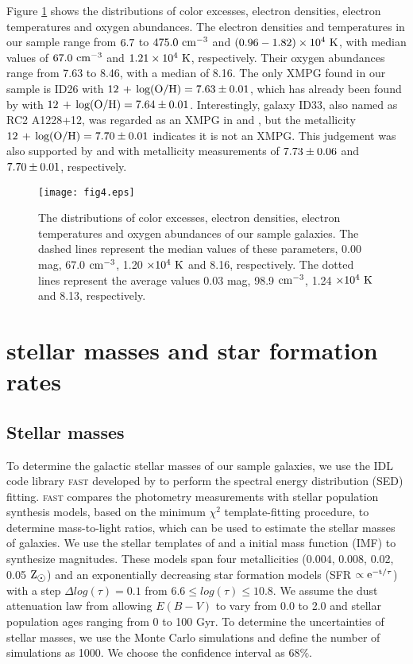 \documentclass[usenatbib]{raa}
\begin{document}
Figure \ref{plot_hist} shows the distributions of color excesses, electron 
densities,
electron temperatures and oxygen abundances.  The electron densities and 
temperatures
in our sample range from $\rm 6.7$ to $\rm 475.0 \ cm^{-3}$ 
and $\rm (0.96\--1.82)\times 10^4 \ K$, with median values of $\rm 67.0 \ 
cm^{-3}$ and
$\rm 1.21\times 10^4 \ K$, respectively.  Their oxygen abundances range from 
7.63 to 8.46, with a median of 8.16. The only  XMPG found in our sample is 
ID26 with
$\rm \hbox{$12\, +\, {\rm log(O/H)}$}=7.63\pm0.01$, which has already been  found by 
\cite{2012AA...546A.122I} with 
$\rm \hbox{$12\, +\, {\rm log(O/H)}$}=7.64\pm0.01$. Interestingly, galaxy ID33, also named as RC2 
A1228+12, was 
regarded as an XMPG in \cite{2000AARv..10....1K} and \cite{2014MNRAS.441.2346B}, 
but the metallicity 
$\rm \hbox{$12\, +\, {\rm log(O/H)}$}=7.70\pm0.01$ indicates it is not an XMPG. This judgement was
also supported by \cite{2002AA...389..779P} and \cite{2012MNRAS.427.1229I} with 
metallicity
measurements of $\rm 7.73\pm0.06$ and $\rm 7.70\pm0.01$, respectively. 

 \begin{figure}[h]
\center
\texttt{[image: fig4.eps]}
\caption{The distributions of color excesses, electron densities, electron 
temperatures
and oxygen abundances of our sample galaxies. The dashed lines represent the 
median values of these 
parameters, 0.00 mag, 67.0 $\rm cm^{-3}$, 1.20 $\rm \times 10^4 \ K$ and 8.16, 
respectively. The dotted 
lines represent the average values 0.03 mag, 98.9 $\rm cm^{-3}$, 1.24
$\rm \times 10^4 \ K$ and 8.13, respectively.}
\label{plot_hist}
\end{figure}
 
\section{stellar masses and star formation rates}
\label{stellar}

\subsection{Stellar masses}
\label{stellar masses}
To determine the galactic stellar masses of our sample galaxies, we use the IDL 
code library 
\textsc{fast} developed by \cite{2009ApJ...700..221K} to perform the spectral 
energy distribution
(SED) fitting. \textsc{fast} compares the photometry measurements with stellar 
population 
synthesis models, based on the minimum $\chi ^2$ template-fitting procedure, to 
determine 
mass-to-light ratios, which can be used to estimate the stellar masses of 
galaxies.  
We use the stellar templates of \cite{2003MNRAS.344.1000B} and a
\cite{2003PASP..115..763C} initial 
mass function (IMF) to synthesize magnitudes. These models span four 
metallicities (0.004, 0.008, 0.02, 0.05 $\hbox{${\rm Z}_{\hbox{$\odot$}}$}$) and an exponentially decreasing 
star
formation models (SFR $\propto \rm e^{-t/\tau}$) with a step $\Delta log(\tau) = 
0.1$ 
from $6.6 \leq log(\tau) \leq 10.8$. We assume the dust attenuation law from
\cite{2000ApJ...533..682C} allowing $E(B-V)$ to vary from 0.0 to 2.0 and stellar 
population
ages ranging from 0 to 100 Gyr. To determine the uncertainties of stellar 
masses, we use the Monte Carlo simulations and define the number of simulations 
as 1000. We choose the confidence interval as 68$\%$. 
\end{document}

